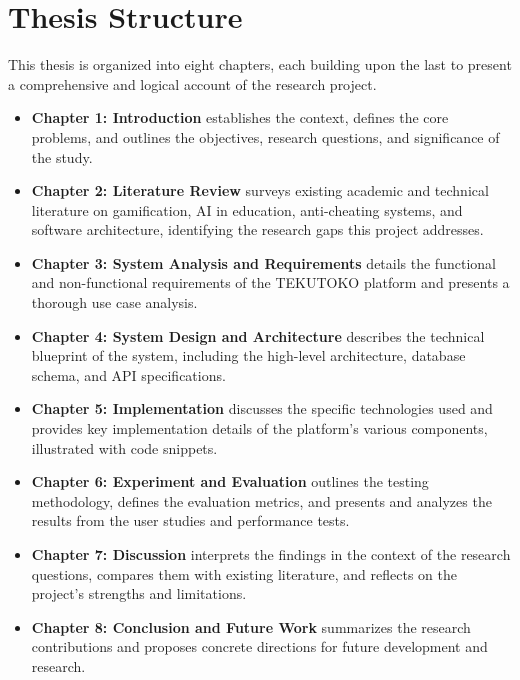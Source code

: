 \section{Thesis Structure}
\label{sec:intro_structure}
This thesis is organized into eight chapters, each building upon the last to present a comprehensive and logical account of the research project.
\begin{itemize}
    \item \textbf{Chapter 1: Introduction} establishes the context, defines the core problems, and outlines the objectives, research questions, and significance of the study.
    \item \textbf{Chapter 2: Literature Review} surveys existing academic and technical literature on gamification, AI in education, anti-cheating systems, and software architecture, identifying the research gaps this project addresses.
    \item \textbf{Chapter 3: System Analysis and Requirements} details the functional and non-functional requirements of the TEKUTOKO platform and presents a thorough use case analysis.
    \item \textbf{Chapter 4: System Design and Architecture} describes the technical blueprint of the system, including the high-level architecture, database schema, and API specifications.
    \item \textbf{Chapter 5: Implementation} discusses the specific technologies used and provides key implementation details of the platform's various components, illustrated with code snippets.
    \item \textbf{Chapter 6: Experiment and Evaluation} outlines the testing methodology, defines the evaluation metrics, and presents and analyzes the results from the user studies and performance tests.
    \item \textbf{Chapter 7: Discussion} interprets the findings in the context of the research questions, compares them with existing literature, and reflects on the project's strengths and limitations.
    \item \textbf{Chapter 8: Conclusion and Future Work} summarizes the research contributions and proposes concrete directions for future development and research.
\end{itemize}